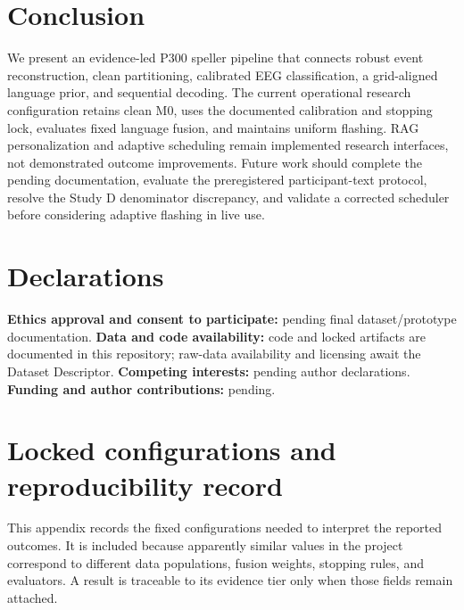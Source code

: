 \documentclass[final,5p,times,twocolumn,authoryear]{elsarticle}
\begin{document}
\section{Conclusion}
We present an evidence-led P300 speller pipeline that connects robust event reconstruction, clean partitioning, calibrated EEG classification, a grid-aligned language prior, and sequential decoding. The current operational research configuration retains clean M0, uses the documented calibration and stopping lock, evaluates fixed language fusion, and maintains uniform flashing. RAG personalization and adaptive scheduling remain implemented research interfaces, not demonstrated outcome improvements. Future work should complete the pending documentation, evaluate the preregistered participant-text protocol, resolve the Study D denominator discrepancy, and validate a corrected scheduler before considering adaptive flashing in live use.

\section*{Declarations}
\textbf{Ethics approval and consent to participate:} pending final dataset/prototype documentation. \textbf{Data and code availability:} code and locked artifacts are documented in this repository; raw-data availability and licensing await the Dataset Descriptor. \textbf{Competing interests:} pending author declarations. \textbf{Funding and author contributions:} pending.

\appendix
\section{Locked configurations and reproducibility record}
This appendix records the fixed configurations needed to interpret the reported outcomes. It is included because apparently similar values in the project correspond to different data populations, fusion weights, stopping rules, and evaluators. A result is traceable to its evidence tier only when those fields remain attached.
\end{document}
